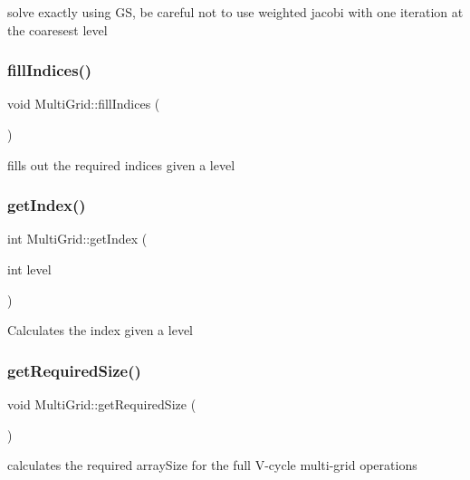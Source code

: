 solve exactly using GS, be careful not to use weighted jacobi with one iteration at the coaresest level \mbox{\label{classMultiGrid_a48269b6f9aa35ef98dbb6f963d4fc34a}} 
\subsubsection{\texorpdfstring{fill\+Indices()}{fillIndices()}}
{\footnotesize\ttfamily void Multi\+Grid\+::fill\+Indices (\begin{DoxyParamCaption}{ }\end{DoxyParamCaption})}

fills out the required indices given a level \mbox{\label{classMultiGrid_a817929f266a2f1c00b6e42516cf3dd96}} 
\subsubsection{\texorpdfstring{get\+Index()}{getIndex()}}
{\footnotesize\ttfamily int Multi\+Grid\+::get\+Index (\begin{DoxyParamCaption}\item[{int}]{level }\end{DoxyParamCaption})}

Calculates the index given a level \mbox{\label{classMultiGrid_a0de44b871082fcd11fc75a97295c2d52}} 
\subsubsection{\texorpdfstring{get\+Required\+Size()}{getRequiredSize()}}
{\footnotesize\ttfamily void Multi\+Grid\+::get\+Required\+Size (\begin{DoxyParamCaption}{ }\end{DoxyParamCaption})}

calculates the required array\+Size for the full V-\/cycle multi-\/grid operations \mbox{\label{classMultiGrid_a06c1e2774135f580e24438153f0ed8d6}} 
